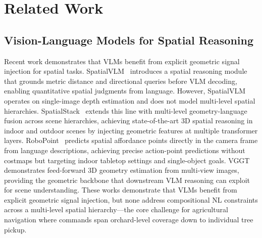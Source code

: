 \documentclass{article}
\begin{document}

\section{Related Work}
\label{sec:related}







\subsection{Vision-Language Models for Spatial Reasoning}
Recent work demonstrates that VLMs benefit from explicit geometric signal injection for spatial tasks. SpatialVLM~\citep{chen2024spatialvlm} introduces a spatial reasoning module that grounds metric distance and directional queries before VLM decoding, enabling quantitative spatial judgments from language. However, SpatialVLM operates on single-image depth estimation and does not model multi-level spatial hierarchies. SpatialStack~\citep{zhang2026spatialstack} extends this line with multi-level geometry-language fusion across scene hierarchies, achieving state-of-the-art 3D spatial reasoning in indoor and outdoor scenes by injecting geometric features at multiple transformer layers. RoboPoint~\citep{yuan2025robopoint} predicts spatial affordance points directly in the camera frame from language descriptions, achieving precise action-point predictions without costmaps but targeting indoor tabletop settings and single-object goals. VGGT~\citep{wang2025vggt} demonstrates feed-forward 3D geometry estimation from multi-view images, providing the geometric backbone that downstream VLM reasoning can exploit for scene understanding. These works demonstrate that VLMs benefit from explicit geometric signal injection, but none address compositional NL constraints across a multi-level spatial hierarchy---the core challenge for agricultural navigation where commands span orchard-level coverage down to individual tree pickup.
\end{document}
